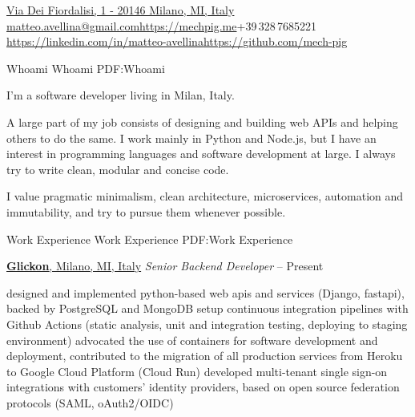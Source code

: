 \documentclass[a4paper,MMMyyyy,nonstopmode]{simpleresumecv}
\makeatletter
\renewcommand{\BulletSymbol}{{\normalfont\fontsize{6.5}{7.8}\selectfont\raisebox{0.17em}{\char"2022}}}
\newcommand{\CVAuthor}{Matteo Avellina}
\newcommand{\CVWebpage}{https://mechpig.me}
\newcommand{\CVGithub}{https://github.com/mech-pig}
\newcommand{\CVLinkedin}{https://linkedin.com/in/matteo-avellina}
\newcommand{\CVEmail}{matteo.avellina@gmail.com}
\newcommand{\CVMobile}{+39\,328\,7685221}
\makeatother
\begin{document}

  \Title{\CVAuthor}

  \begin{SubTitle}
    \href{https://www.google.com/maps/place/Via+dei+Fiordalisi,+1,+20146+Milano+MI}{Via Dei Fiordalisi, 1 - 20146 Milano, MI, Italy}
    \Gap
    \href{mailto:\CVEmail}{\CVEmail}\enspace\BulletSymbol\enspace\href{\CVWebpage}{\CVWebpage}\enspace\BulletSymbol\enspace\CVMobile
    \Gap
    \href{\CVLinkedin}{\CVLinkedin}\enspace\BulletSymbol\enspace\href{\CVGithub}{\CVGithub}
  \end{SubTitle}

  \begin{Body}

    \Section
    {Whoami}
    {Whoami}
    {PDF:Whoami}
    \begin{Detail}
      I'm a software developer living in Milan, Italy.
      \par
      A large part of my job consists of designing and building web APIs and helping others to do the same. I work mainly in Python and Node.js, but I have an interest in programming languages and software development at large. I always try to write clean, modular and concise code.
      \par
      I value pragmatic minimalism, clean architecture, microservices, automation and immutability, and try to pursue them whenever possible.
    \end{Detail}

    \Section
    {Work Experience}
    {Work Experience}
    {PDF:Work Experience}

      \Entry
        \href{https://www.glickon.com}{\textbf{Glickon}, Milano, MI, Italy}
        \Gap
        \textit{Senior Backend Developer}
          \hfill
           -- Present
        \Gap
        \begin{Detail}
          \Gap
          \BulletItem
            designed and implemented python-based web apis and services (Django, fastapi), backed by PostgreSQL and MongoDB
          \BulletItem
            setup continuous integration pipelines with Github Actions (static analysis, unit and integration testing, deploying to staging environment)
          \BulletItem
            advocated the use of containers for software development and deployment, contributed to the migration of all production services from Heroku to Google Cloud Platform (Cloud Run)
          \BulletItem
            developed multi-tenant single sign-on integrations with customers' identity providers, based on open source federation protocols (SAML, oAuth2/OIDC) 
        \end{Detail}
      

\end{Body}
\end{document}
